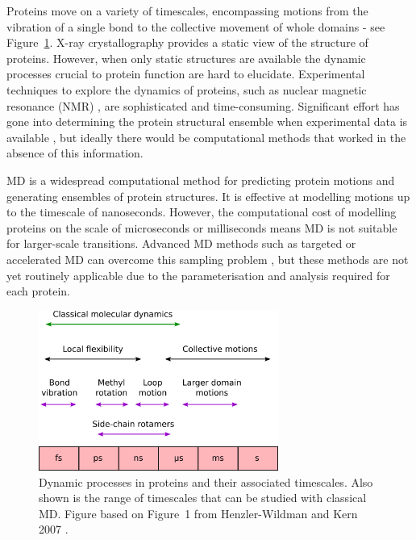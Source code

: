 Proteins move on a variety of timescales, encompassing motions from the vibration of a single bond to the collective movement of whole domains \cite{Henzler-Wildman2007, Wei2016} - see Figure~\ref{fig:timescales}.
X-ray crystallography provides a static view of the structure of proteins.
However, when only static structures are available the dynamic processes crucial to protein function \cite{Henzler-Wildman2007a} are hard to elucidate.
Experimental techniques to explore the dynamics of proteins, such as nuclear magnetic resonance (NMR) \cite{Sormanni2017}, are sophisticated and time-consuming.
Significant effort has gone into determining the protein structural ensemble when experimental data is available \cite{Bonomi2017}, but ideally there would be computational methods that worked in the absence of this information.

MD is a widespread computational method for predicting protein motions and generating ensembles of protein structures.
It is effective at modelling motions up to the timescale of nanoseconds.
However, the computational cost of modelling proteins on the scale of microseconds or milliseconds means MD is not suitable for larger-scale transitions.
Advanced MD methods such as targeted or accelerated MD can overcome this sampling problem \cite{Maximova2016}, but these methods are not yet routinely applicable due to the parameterisation and analysis required for each protein.


\begin{figure}
\centering

\includegraphics[width=0.7\textwidth]{figures/timescales/timescales}

\caption[Timescales of protein motions]
{Dynamic processes in proteins and their associated timescales.
Also shown is the range of timescales that can be studied with classical MD.
Figure based on Figure~1 from Henzler-Wildman and Kern 2007 \cite{Henzler-Wildman2007}.}

\label{fig:timescales}
\end{figure}


